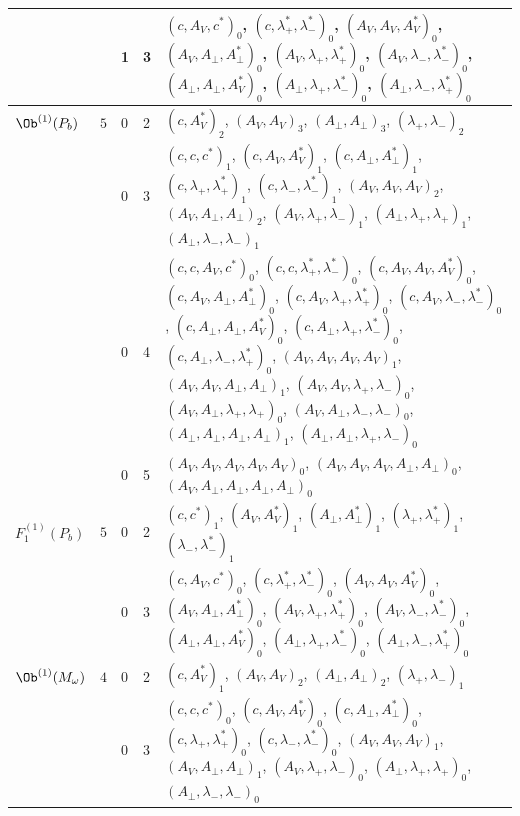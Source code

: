 {\begin{longtable}{>{\raggedright}p{2.3cm}|p{0.6cm}|p{0.25cm}|p{0.25cm}|>{\raggedright\arraybackslash}p{11.6cm}}
 &  & 1 & 3 & $(c,A_V,c^*)_{0}$, $(c,\lambda^*_+,\lambda^*_-)_{0}$, $(A_V,A_V,A^*_V)_{0}$, $(A_V,A_\perp,A^*_\perp)_{0}$, $(A_V,\lambda_+,\lambda^*_+)_{0}$, $(A_V,\lambda_-,\lambda^*_-)_{0}$, $(A_\perp,A_\perp,A^*_V)_{0}$, $(A_\perp,\lambda_+,\lambda^*_-)_{0}$, $(A_\perp,\lambda_-,\lambda^*_+)_{0}$ \\
\hline
$\Ob^{(1)}(P_b)$ & $5$ & 0 & 2 & $(c,A^*_V)_{2}$, $(A_V,A_V)_{3}$, $(A_\perp,A_\perp)_{3}$, $(\lambda_+,\lambda_-)_{2}$ \\
 &  & 0 & 3 & $(c,c,c^*)_{1}$, $(c,A_V,A^*_V)_{1}$, $(c,A_\perp,A^*_\perp)_{1}$, $(c,\lambda_+,\lambda^*_+)_{1}$, $(c,\lambda_-,\lambda^*_-)_{1}$, $(A_V,A_V,A_V)_{2}$, $(A_V,A_\perp,A_\perp)_{2}$, $(A_V,\lambda_+,\lambda_-)_{1}$, $(A_\perp,\lambda_+,\lambda_+)_{1}$, $(A_\perp,\lambda_-,\lambda_-)_{1}$ \\
 &  & 0 & 4 & $(c,c,A_V,c^*)_{0}$, $(c,c,\lambda^*_+,\lambda^*_-)_{0}$, $(c,A_V,A_V,A^*_V)_{0}$, $(c,A_V,A_\perp,A^*_\perp)_{0}$, $(c,A_V,\lambda_+,\lambda^*_+)_{0}$, $(c,A_V,\lambda_-,\lambda^*_-)_{0}$, $(c,A_\perp,A_\perp,A^*_V)_{0}$, $(c,A_\perp,\lambda_+,\lambda^*_-)_{0}$, $(c,A_\perp,\lambda_-,\lambda^*_+)_{0}$, $(A_V,A_V,A_V,A_V)_{1}$, $(A_V,A_V,A_\perp,A_\perp)_{1}$, $(A_V,A_V,\lambda_+,\lambda_-)_{0}$, $(A_V,A_\perp,\lambda_+,\lambda_+)_{0}$, $(A_V,A_\perp,\lambda_-,\lambda_-)_{0}$, $(A_\perp,A_\perp,A_\perp,A_\perp)_{1}$, $(A_\perp,A_\perp,\lambda_+,\lambda_-)_{0}$ \\
 &  & 0 & 5 & $(A_V,A_V,A_V,A_V,A_V)_{0}$, $(A_V,A_V,A_V,A_\perp,A_\perp)_{0}$, $(A_V,A_\perp,A_\perp,A_\perp,A_\perp)_{0}$ \\
\hline
$F_1^{(1)}(P_b)$ & $5$ & 0 & 2 & $(c,c^*)_{1}$, $(A_V,A^*_V)_{1}$, $(A_\perp,A^*_\perp)_{1}$, $(\lambda_+,\lambda^*_+)_{1}$, $(\lambda_-,\lambda^*_-)_{1}$ \\
 &  & 0 & 3 & $(c,A_V,c^*)_{0}$, $(c,\lambda^*_+,\lambda^*_-)_{0}$, $(A_V,A_V,A^*_V)_{0}$, $(A_V,A_\perp,A^*_\perp)_{0}$, $(A_V,\lambda_+,\lambda^*_+)_{0}$, $(A_V,\lambda_-,\lambda^*_-)_{0}$, $(A_\perp,A_\perp,A^*_V)_{0}$, $(A_\perp,\lambda_+,\lambda^*_-)_{0}$, $(A_\perp,\lambda_-,\lambda^*_+)_{0}$ \\
\hline
$\Ob^{(1)}(M_\omega)$ & $4$ & 0 & 2 & $(c,A^*_V)_{1}$, $(A_V,A_V)_{2}$, $(A_\perp,A_\perp)_{2}$, $(\lambda_+,\lambda_-)_{1}$ \\
 &  & 0 & 3 & $(c,c,c^*)_{0}$, $(c,A_V,A^*_V)_{0}$, $(c,A_\perp,A^*_\perp)_{0}$, $(c,\lambda_+,\lambda^*_+)_{0}$, $(c,\lambda_-,\lambda^*_-)_{0}$, $(A_V,A_V,A_V)_{1}$, $(A_V,A_\perp,A_\perp)_{1}$, $(A_V,\lambda_+,\lambda_-)_{0}$, $(A_\perp,\lambda_+,\lambda_+)_{0}$, $(A_\perp,\lambda_-,\lambda_-)_{0}$ \\

\end{longtable}}
